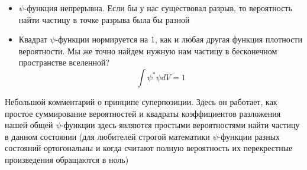 \documentclass[12pt]{article}
\begin{document}
\begin{itemize}
    \item $\psi$-функция непрерывна. Если бы у нас существовал разрыв, то вероятность найти частицу в точке разрыва была бы разной
    \item Квадрат $\psi$-функции нормируется на 1, как и любая другая функция плотности вероятности. Мы же точно найдем нужную нам частицу в бесконечном пространстве вселенной? $$\int\psi^*\psi dV = 1$$
\end{itemize}
Небольшой комментарий о принципе суперпозиции. Здесь он работает, как простое суммирование вероятностей и квадраты коэффициентов разложения нашей общей $\psi$-функции здесь являются простыми вероятностями найти частицу в данном состоянии (для любителей строгой математики $\psi$-функции разных состояний ортогональны и когда считают полную вероятность их перекрестные произведения обращаются в ноль)
\end{document}
